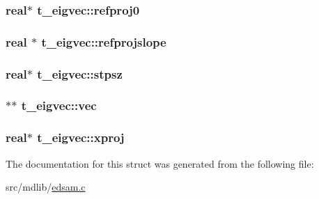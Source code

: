 \hypertarget{structt__eigvec_a911a08f7d6b04819b35a5cc33e611cc5}{
\subsubsection[{refproj0}]{\setlength{\rightskip}{0pt plus 5cm}real$\ast$ {\bf t\-\_\-eigvec\-::refproj0}}}\label{structt__eigvec_a911a08f7d6b04819b35a5cc33e611cc5}
\hypertarget{structt__eigvec_a218ec17856e96a45e79392a5e08f8567}{
\subsubsection[{refprojslope}]{\setlength{\rightskip}{0pt plus 5cm}real $\ast$ {\bf t\-\_\-eigvec\-::refprojslope}}}\label{structt__eigvec_a218ec17856e96a45e79392a5e08f8567}
\hypertarget{structt__eigvec_a541424f6ea4b3b184f038b6f6476bd9a}{
\subsubsection[{stpsz}]{\setlength{\rightskip}{0pt plus 5cm}real$\ast$ {\bf t\-\_\-eigvec\-::stpsz}}}\label{structt__eigvec_a541424f6ea4b3b184f038b6f6476bd9a}
\hypertarget{structt__eigvec_a68aa70393c51dfc227bec529c144b2c4}{
\subsubsection[{vec}]{$\ast$$\ast$ {\bf t\-\_\-eigvec\-::vec}}}\label{structt__eigvec_a68aa70393c51dfc227bec529c144b2c4}
\hypertarget{structt__eigvec_a7bd612d7fbd337f61d0a413e7197334d}{
\subsubsection[{xproj}]{\setlength{\rightskip}{0pt plus 5cm}real$\ast$ {\bf t\-\_\-eigvec\-::xproj}}}\label{structt__eigvec_a7bd612d7fbd337f61d0a413e7197334d}


\-The documentation for this struct was generated from the following file\-:\begin{DoxyCompactItemize}
\item 
src/mdlib/\hyperlink{edsam_8c}{edsam.\-c}\end{DoxyCompactItemize}
